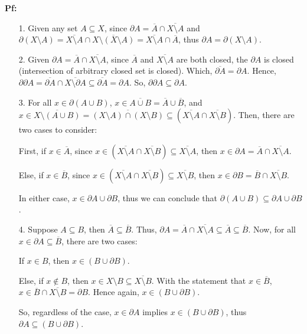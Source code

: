 \documentclass{article}
\begin{document}
\textbf{Pf:}

\begin{itemize}
    \item[1.] Given any set $A\subseteq X$, since $\partial A=\overline{A}\cap \overline{X\setminus A}$ and $\partial(X\setminus A)=\overline{X\setminus A}\cap \overline{X\setminus(X\setminus A)}=\overline{X\setminus A}\cap \overline{A}$,
    thus $\partial A=\partial (X\setminus A)$.

    \hfill

    \item[2.] Given $\partial A=\overline{A}\cap \overline{X\setminus A}$, since $\overline{A}$ and $\overline{X\setminus A}$ are both closed, the $\partial A$ is closed (intersection of arbitrary closed set is closed).
    Which, $\overline{\partial A}=\partial A$. Hence, $\partial \partial A=\overline{\partial A}\cap \overline{X\setminus \partial A}\subseteq \overline{\partial A}=\partial A$.
    So, $\partial\partial A\subseteq \partial A$.

    \hfill

    \item[3.] For all $x\in \partial(A\cup B)$, $x\in \overline{A\cup B} = \overline{A}\cup \overline{B}$, and $x\in \overline{X\setminus(A\cup B)}=\overline{(X\setminus A)\cap (X\setminus B)}\subseteq (\overline{X\setminus A}\cap \overline{X\setminus B})$. 
    Then, there are two cases to consider:
    
    First, if $x\in \overline{A}$, since $x\in (\overline{X\setminus A}\cap \overline{X\setminus B})\subseteq \overline{X\setminus A}$, then $x\in \partial A = \overline{A}\cap\overline{X\setminus A}$.

    Else, if $x\in \overline{B}$, since $x\in (\overline{X\setminus A}\cap \overline{X\setminus B})\subseteq \overline{X\setminus B}$, then $x\in \partial B = \overline{B}\cap\overline{X\setminus B}$.

    In either case, $x\in \partial A\cup \partial B$, thus we can conclude that $\partial(A\cup B)\subseteq \partial A\cup \partial B$.

    \hfill

    \item[4.] Suppose $A\subseteq B$, then $\overline{A}\subseteq \overline{B}$. Thus, $\partial A=\overline{A}\cap\overline{X\setminus A}\subseteq \overline{A}\subseteq \overline{B}$. 
    Now, for all $x\in \partial A\subseteq \overline{B}$, there are two cases:
    
    If $x\in B$, then $x\in (B\cup \partial B)$.

    Else, if $x\notin B$, then $x\in X\setminus B\subseteq \overline{X\setminus B}$. With the statement that $x\in \overline{B}$, $x\in \overline{B}\cap \overline{X\setminus B} = \partial B$.
    Hence again, $x\in (B\cup \partial B)$.

    So, regardless of the case, $x\in \partial A$ implies $x\in (B\cup \partial B)$, thus $\partial A\subseteq (B\cup \partial B)$.
\end{itemize}
\end{document}
